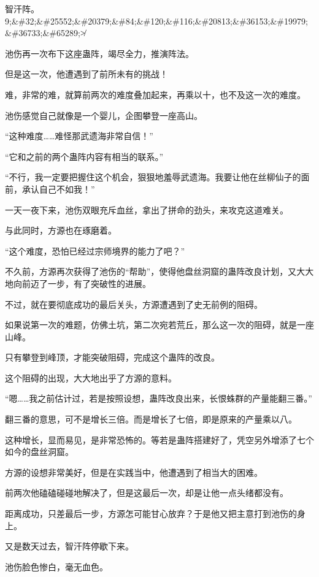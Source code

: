 
\begin{this_body}

智汗阵。9;\&\#32;\&\#25552;\&\#20379;\&\#84;\&\#120;\&\#116;\&\#20813;\&\#36153;\&\#19979;\&\#36733;\&\#65289;≯

池伤再一次布下这座蛊阵，竭尽全力，推演阵法。

但是这一次，他遭遇到了前所未有的挑战！

难，非常的难，就算前两次的难度叠加起来，再乘以十，也不及这一次的难度。

池伤感觉自己就像是一个婴儿，企图攀登一座高山。

“这种难度……难怪那武遗海非常自信！”

“它和之前的两个蛊阵内容有相当的联系。”

“不行，我一定要把握住这个机会，狠狠地羞辱武遗海。我要让他在丝柳仙子的面前，承认自己不如我！”

一天一夜下来，池伤双眼充斥血丝，拿出了拼命的劲头，来攻克这道难关。

与此同时，方源也在琢磨着。

“这个难度，恐怕已经过宗师境界的能力了吧？”

不久前，方源再次获得了池伤的“帮助”，使得他盘丝洞窟的蛊阵改良计划，又大大地向前迈了一步，有了突破性的进展。

不过，就在要彻底成功的最后关头，方源遭遇到了史无前例的阻碍。

如果说第一次的难题，仿佛土坑，第二次宛若荒丘，那么这一次的阻碍，就是一座山峰。

只有攀登到峰顶，才能突破阻碍，完成这个蛊阵的改良。

这个阻碍的出现，大大地出乎了方源的意料。

“嗯……我之前估计过，若是按照设想，蛊阵改良出来，长恨蛛群的产量能翻三番。”

翻三番的意思，可不是增长三倍。而是增长了七倍，即是原来的产量乘以八。

这种增长，显而易见，是非常恐怖的。等若是蛊阵搭建好了，凭空另外增添了七个如今的盘丝洞窟。

方源的设想非常美好，但是在实践当中，他遭遇到了相当大的困难。

前两次他磕磕碰碰地解决了，但是这最后一次，却是让他一点头绪都没有。

距离成功，只差最后一步，方源怎可能甘心放弃？于是他又把主意打到池伤的身上。

又是数天过去，智汗阵停歇下来。

池伤脸色惨白，毫无血色。


\end{this_body}
